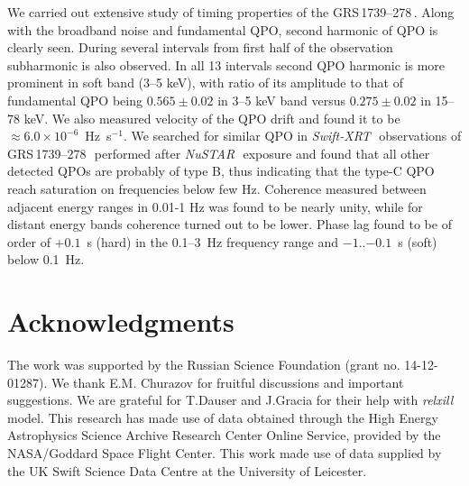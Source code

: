 \documentclass[a4paper,fleqn,usenatbib]{mnras}
\def\grs{{GRS\,1739--278\,}}
\def\swiftx{{\em Swift-XRT\,}}
\def\nustar{{\em NuSTAR\,}}
\begin{document}
We carried out extensive study of timing properties of the \grs. 
Along with the broadband noise and fundamental QPO, second harmonic of QPO is clearly seen. 
During several intervals from first half of the observation subharmonic is also observed. 
In all 13 intervals second QPO harmonic is more prominent in soft band (3--5 keV), with ratio of its amplitude to that of fundamental QPO being $0.565\pm0.02$ in 3--5 keV band versus $0.275\pm0.02$ in 15--78 keV.  
We also measured velocity of the QPO drift and found it to be $\approx6.0\times10^{-6}$~Hz~s$^{-1}$. 
We searched for similar QPO in \swiftx\, observations of \grs\ performed after \nustar\, exposure and found that all other detected QPOs are probably of type B, thus indicating that the type-C QPO reach saturation on frequencies below few Hz. 
Coherence measured between adjacent energy ranges in 0.01-1 Hz was found to be nearly unity, while for distant energy bands coherence turned out to be lower. 
Phase lag found to be of order of $+0.1$~s (hard) in the 0.1--3~Hz frequency range and $-1$..$-0.1$~s (soft) below 0.1~Hz.


\section*{Acknowledgments}
The work was supported by the Russian Science Foundation (grant no. 14-12-01287). 
We thank E.M. Churazov for fruitful discussions and important suggestions. 
We are grateful for T.Dauser and J.Gracia for their help with {\em relxill} model. 
This research has made use of data obtained through the High Energy Astrophysics Science Archive Research Center Online Service, provided by the NASA/Goddard Space Flight Center.
This work made use of data supplied by the UK Swift Science Data Centre at the University of Leicester.



\bsp	
\label{lastpage}
\end{document}
